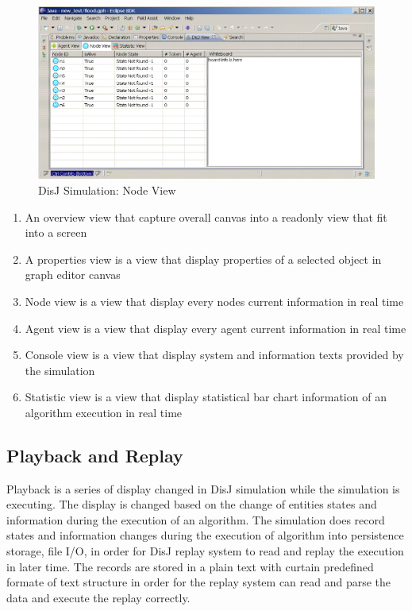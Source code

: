 \begin{figure}[ht!]
\includegraphics[width=1.0\textwidth,keepaspectratio]{./figure45}
\caption{DisJ Simulation: Node View}
\label{pic:fig45}
\end{figure}

\begin{enumerate}
\item An overview view that capture overall canvas into a readonly view that fit into a screen
\item A properties view is a view that display properties of a selected object in graph editor canvas
\item Node view is a view that display every nodes current information in real time
\item Agent view is a view that display every agent current information in real time
\item Console view is a view that display system and information texts provided by the simulation
\item Statistic view is a view that display statistical bar chart information of an algorithm execution in real time
\end{enumerate}


\subsection{Playback and Replay}
Playback is a series of display changed in DisJ simulation while the simulation is executing. The display is changed based on the change of entities states and information during the execution of an algorithm. The simulation does record states and information changes during the execution of algorithm into persistence storage, file I/O, in order for DisJ replay system to read and replay the execution in later time. The records are stored in a plain text with curtain predefined formate of text structure in order for the replay system can read and parse the data and execute the replay correctly.

